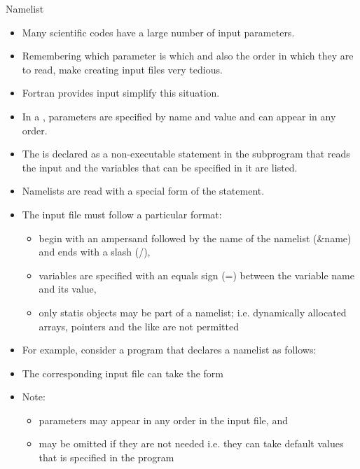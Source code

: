 \documentclass[10pt,t]{beamer}
\begin{document}
\begin{frame}{Namelist}
  \begin{itemize}
    \item Many scientific codes have a large number of input parameters.
    \item Remembering which parameter is which and also the order in which they are to read, make creating input files very tedious.
    \item Fortran provides  input simplify this situation.
    \item In a , parameters are specified by name and value and can appear in any order.
    \item The  is declared as a non-executable statement in the subprogram that reads the input and the variables that can be specified in it are listed.\\
    \item Namelists are read with a special form of the  statement.\\
      \framebreak
    \item The input file must follow a particular format:
      \begin{itemize}
        \item begin with an ampersand followed by the name of the namelist (\&name) and ends with a slash (/),
        \item variables are specified with an equals sign (=) between the variable name and its value,
        \item only statis objects may be part of a namelist; i.e. dynamically allocated arrays, pointers and the like are not permitted
      \end{itemize}
    \item For example, consider a program that declares a namelist as follows:\\
    \item The corresponding input file can take the form
      
    \item Note:
      \begin{itemize}
        \item parameters may appear in any order in the input file, and
        \item may be omitted if they are not needed i.e. they can take default values that is specified in the program

\end{itemize}
\end{itemize}
\end{frame}
\end{document}

